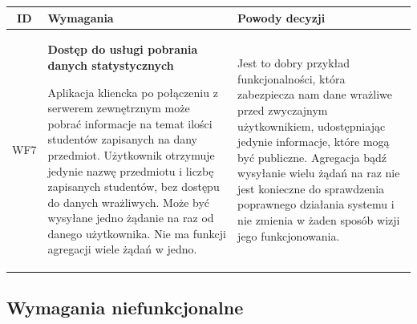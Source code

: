 \newpage
\begin{tabularx}{\textwidth}{|c|X|X|}
\hline
\textbf{ID} & \textbf{Wymagania}  & \textbf{Powody decyzji} \\
\hline

\label{z:WF7} WF7 & \textbf{Dostęp do usługi pobrania danych statystycznych} 
 
Aplikacja kliencka po połączeniu z serwerem zewnętrznym może pobrać informacje na temat ilości studentów zapisanych na dany przedmiot. Użytkownik otrzymuje jedynie nazwę przedmiotu i liczbę zapisanych studentów, bez dostępu do danych wrażliwych. Może być wysyłane jedno żądanie na raz od danego użytkownika. Nie ma funkcji agregacji wiele żądań w jedno. & 
Jest to dobry przykład funkcjonalności, która zabezpiecza nam dane wrażliwe przed zwyczajnym użytkownikiem, udostępniając jedynie informacje, które mogą być publiczne. Agregacja bądź wysyłanie wielu żądań na raz nie jest konieczne do sprawdzenia poprawnego działania systemu i nie zmienia w żaden sposób wizji jego funkcjonowania.\\
\hline



\end{tabularx}

\subsection[Wymagania niefunkcjonalne]{Wymagania niefunkcjonalne}


